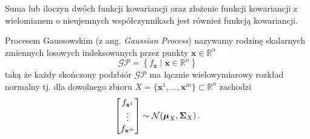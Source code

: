 \documentclass{myclass}
\numberwithin{equation}{subsection}
\begin{document}
\begin{theorem}
Suma lub iloczyn dwóch funkcji kowariancji oraz złożenie funkcji kowariancji z wielomianem o
nieujemnych współczynnikach jest również funkcją kowariancji.
\end{theorem}

\begin{definition}
Procesem Gaussowskim (z ang. \textit{Gaussian Process}) nazywamy rodzinę skalarnych zmiennych
losowych indeksowanych przez punkty \(\mathbf{x} \in \mathbb{R}^n\)
\begin{equation*}
    \mathcal{GP} = \left\{f_\mathbf{x} \mid \mathbf{x} \in \mathbb{R}^n\right\}
\end{equation*}
taką że każdy skończony podzbiór \(\mathcal{GP}\) ma łącznie wielowymiarowy rozkład normalny tj. dla
dowolnego zbioru \(X = \{\mathbf{x}^1, \ldots, \mathbf{x}^m\} \subset \mathbb{R}^n\) zachodzi
\begin{equation*}
    \mqty[f_{\mathbf{x}^1} \\ \vdots \\ f_{\mathbf{x}^m}] \sim \mathcal{N}(\boldsymbol{\mu}_X, \mathbf{\Sigma}_{X})\,.
\end{equation*}
\end{definition}
\end{document}
